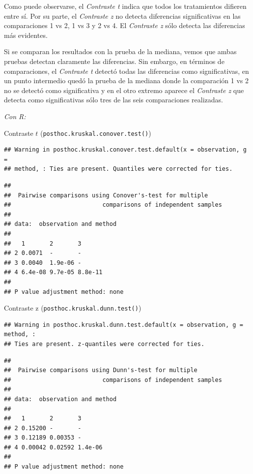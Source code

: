 \documentclass[]{book}
\theoremstyle{definition}
\theoremstyle{definition}
\theoremstyle{definition}
\theoremstyle{remark}
\begin{document}
Como puede observarse, el \emph{Contraste t} indica que todos los
tratamientos difieren entre sí. Por su parte, el \emph{Contraste z} no
detecta diferencias significativas en las comparaciones 1 vs 2, 1 vs 3 y
2 vs 4. El \emph{Contraste z} sólo detecta las diferencias más
evidentes.

Si se comparan los resultados con la prueba de la mediana, vemos que
ambas pruebas detectan claramente las diferencias. Sin embargo, en
términos de comparaciones, el \emph{Contraste t} detectó todas las
diferencias como significativas, en un punto intermedio quedó la prueba
de la mediana donde la comparación 1 vs 2 no se detectó como
significativa y en el otro extremo aparece el \emph{Contraste z} que
detecta como significativas sólo tres de las seis comparaciones
realizadas.

\emph{Con R:}

Contraste \(t\) (\texttt{posthoc.kruskal.conover.test()})

\begin{verbatim}
## Warning in posthoc.kruskal.conover.test.default(x = observation, g =
## method, : Ties are present. Quantiles were corrected for ties.
\end{verbatim}

\begin{verbatim}
## 
##  Pairwise comparisons using Conover's-test for multiple  
##                          comparisons of independent samples 
## 
## data:  observation and method 
## 
##   1       2       3      
## 2 0.0071  -       -      
## 3 0.0040  1.9e-06 -      
## 4 6.4e-08 9.7e-05 8.8e-11
## 
## P value adjustment method: none
\end{verbatim}

Contraste z (\texttt{posthoc.kruskal.dunn.test()})

\begin{verbatim}
## Warning in posthoc.kruskal.dunn.test.default(x = observation, g = method, :
## Ties are present. z-quantiles were corrected for ties.
\end{verbatim}

\begin{verbatim}
## 
##  Pairwise comparisons using Dunn's-test for multiple 
##                          comparisons of independent samples 
## 
## data:  observation and method 
## 
##   1       2       3      
## 2 0.15200 -       -      
## 3 0.12189 0.00353 -      
## 4 0.00042 0.02592 1.4e-06
## 
## P value adjustment method: none
\end{verbatim}
\end{document}
